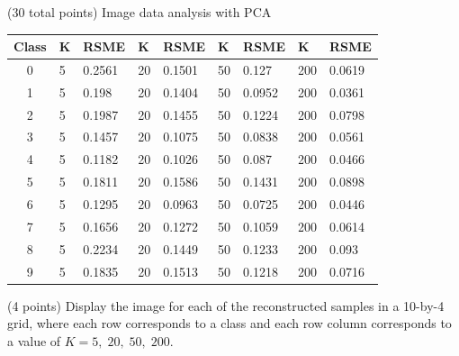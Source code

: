 \documentclass[12pt]{article}
\begin{document}
\begin{question}{(30 total points) Image data analysis with PCA}
\begin{subquestion}
      \begin{answerbox}{25em}
         \centering
        \begin{tabular}{|c|l|l|l|l|l|l|l|l|}
            \hline
            \textbf{Class} & \textbf{K} & \textbf{RSME} & \textbf{K} & \textbf{RSME} & \textbf{K} & \textbf{RSME} & \textbf{K} & \textbf{RSME}   \\ \hline
            0     & 5 & 0.2561 & 20 & 0.1501 & 50 & 0.127 & 200 & 0.0619 \\ \hline
            1     & 5 & 0.198 & 20 & 0.1404 & 50 & 0.0952 & 200 & 0.0361 \\ \hline
            2     & 5 & 0.1987 & 20 & 0.1455 & 50 & 0.1224 & 200 & 0.0798 \\ \hline
            3     & 5 & 0.1457 & 20 & 0.1075 & 50 & 0.0838 & 200 & 0.0561 \\ \hline
            4     & 5 & 0.1182 & 20 & 0.1026 & 50 & 0.087 & 200 & 0.0466 \\ \hline
            5     & 5 & 0.1811 & 20 & 0.1586 & 50 & 0.1431 & 200 & 0.0898 \\ \hline
            6     & 5 & 0.1295 & 20 & 0.0963 & 50 & 0.0725 & 200 & 0.0446 \\ \hline
            7     & 5 & 0.1656 & 20 & 0.1272 & 50 & 0.1059 & 200 & 0.0614 \\ \hline
            8     & 5 & 0.2234 & 20 & 0.1449 & 50 & 0.1233 & 200 & 0.093 \\ \hline
            9     & 5 & 0.1835 & 20 & 0.1513 & 50 & 0.1218 & 200 & 0.0716 \\ \hline
        \end{tabular}
      \end{answerbox}
  


   \end{subquestion}
   
   \begin{subquestion}{(4 points)
       Display the image for each of the reconstructed samples in
       a 10-by-4 grid, where each row corresponds to a class and
       each row column corresponds to a value of $K=5, \; 20, \; 50, \; 200$.
     } \label{Q1.7}


   


\end{subquestion}
\end{question}
\end{document}
